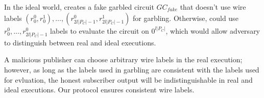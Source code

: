 In the ideal world, \Sim creates a fake garbled circuit $GC_{fake}$ that
doesn't use wire labels $(r_0^0, r_0^1), \ldots, (r_{2l|P_C|-1}^0
,r_{2l|P_C|-1}^1)$ for garbling. Otherwise, \Adv could use $r_0^0, \ldots,
r_{2l|P_C|-1}^0$ labels to evaluate the circuit on $0^{l|P_C|}$, which would
allow adversary to distinguish between real and ideal executions.

A malicious publisher can choose arbitrary wire labels in the real execution;
however, as long as the labels used in garbling are consistent with the labels
used for evluation, the honest subscriber output will be indistinguishable in
real and ideal executions. Our protocol ensures consistent wire labels. 

%
%
%
%
%
%
%
%
%
